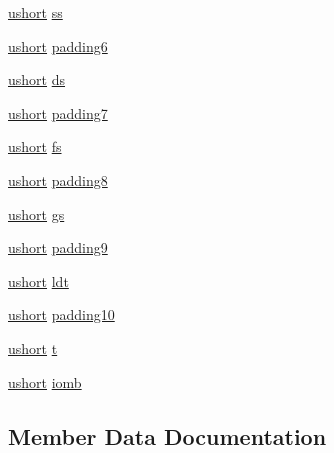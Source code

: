 \begin{DoxyCompactItemize}
\item 
\hyperlink{custom__types_8h_ab95f123a6c9bcfee6a343170ef8c5f69}{ushort} \hyperlink{structtaskstate_afdd8f3985ac7ae69fc67c19d65653f12}{ss}
\item 
\hyperlink{custom__types_8h_ab95f123a6c9bcfee6a343170ef8c5f69}{ushort} \hyperlink{structtaskstate_a3885094380c4d991fa86d31fdf1b9683}{padding6}
\item 
\hyperlink{custom__types_8h_ab95f123a6c9bcfee6a343170ef8c5f69}{ushort} \hyperlink{structtaskstate_af5f19782df3eb439445274e08d9120f1}{ds}
\item 
\hyperlink{custom__types_8h_ab95f123a6c9bcfee6a343170ef8c5f69}{ushort} \hyperlink{structtaskstate_a4c634b4b3cd489ca37979561394bf518}{padding7}
\item 
\hyperlink{custom__types_8h_ab95f123a6c9bcfee6a343170ef8c5f69}{ushort} \hyperlink{structtaskstate_a4ce0e6f25b9721d7e2660c8840a0f9e3}{fs}
\item 
\hyperlink{custom__types_8h_ab95f123a6c9bcfee6a343170ef8c5f69}{ushort} \hyperlink{structtaskstate_ab3077e8c9fe9b50ff7caedeeac075472}{padding8}
\item 
\hyperlink{custom__types_8h_ab95f123a6c9bcfee6a343170ef8c5f69}{ushort} \hyperlink{structtaskstate_a15529ac51461a168be78130042a740e7}{gs}
\item 
\hyperlink{custom__types_8h_ab95f123a6c9bcfee6a343170ef8c5f69}{ushort} \hyperlink{structtaskstate_a58a780ba0664e4ff8741adbdaccbcdd5}{padding9}
\item 
\hyperlink{custom__types_8h_ab95f123a6c9bcfee6a343170ef8c5f69}{ushort} \hyperlink{structtaskstate_a960e5d4a40dcafb35f32ec047c0ca147}{ldt}
\item 
\hyperlink{custom__types_8h_ab95f123a6c9bcfee6a343170ef8c5f69}{ushort} \hyperlink{structtaskstate_a6f95dd6d0ae39afaaf5ee8671220b00b}{padding10}
\item 
\hyperlink{custom__types_8h_ab95f123a6c9bcfee6a343170ef8c5f69}{ushort} \hyperlink{structtaskstate_ad9d64e6139f851a3f8d2275f2748fae5}{t}
\item 
\hyperlink{custom__types_8h_ab95f123a6c9bcfee6a343170ef8c5f69}{ushort} \hyperlink{structtaskstate_a5ee57b190324239a5d88f7c02039901f}{iomb}
\end{DoxyCompactItemize}


\subsection{Member Data Documentation}
